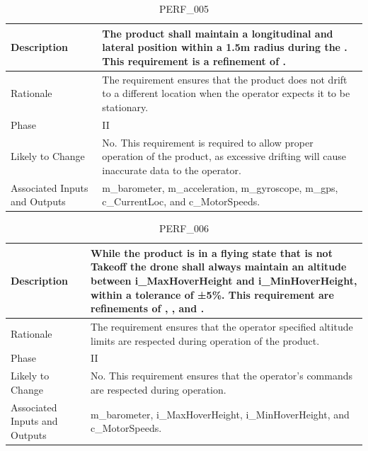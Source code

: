 \documentclass{article}
\begin{document}
\begin{table}[!h]
\begin{center}
\caption {PERF\_005} 
\label{PERF_005}
\begin{tabular}{ | m{3cm} | m{11cm} | }
\hline
Description & The product shall maintain a longitudinal and lateral position within a 1.5m radius during the \nameref{Hover State}. This requirement is a refinement of \nameref{STA_001}. \\
\hline
Rationale & The requirement ensures that the product does not drift to a different location when the operator expects it to be stationary. \\
\hline
Phase & II \\
\hline
Likely to Change & No. This requirement is required to allow proper operation of the product, as excessive drifting will cause inaccurate data to the operator. \\
\hline
Associated Inputs and Outputs & m\_barometer, m\_acceleration, m\_gyroscope, m\_gps, c\_CurrentLoc, and c\_MotorSpeeds.  \\
\hline
\end{tabular}
\end{center}
\end{table}

\begin{table}[!h]
\begin{center}
\caption {PERF\_006} 
\label{PERF_006}
\begin{tabular}{ | m{3cm} | m{11cm} | }
\hline
Description & While the product is in a flying state that is not Takeoff the drone shall always maintain an altitude between i\_MaxHoverHeight and i\_MinHoverHeight, within a tolerance of ±5\%. This requirement are refinements of \nameref{STA_001}, \nameref{STA_002}, \nameref{STA_011} and \nameref{STA_003}.  \\
\hline
Rationale & The requirement ensures that the operator specified altitude limits are respected during operation of the product. \\
\hline
Phase & II \\
\hline
Likely to Change & No. This requirement ensures that the operator's commands are respected during operation. \\
\hline
Associated Inputs and Outputs & m\_barometer, i\_MaxHoverHeight, i\_MinHoverHeight, and c\_MotorSpeeds.  \\
\hline
\end{tabular}
\end{center}
\end{table}
\end{document}
